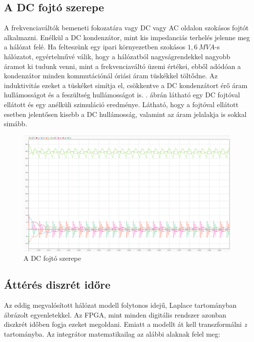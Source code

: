 \subsection{A DC fojtó szerepe}

A frekvenciaváltók bemeneti fokozatára vagy DC vagy AC oldalon szokásos fojtót alkalmazni. Enélkül a DC kondenzátor, mint kis impedanciás terhelés jelenne meg a hálózat felé. Ha felteszünk egy ipari környezetben szokásos $1,6\ MVA$-s hálózatot, egyértelművé válik, hogy a hálózatból nagyságrendekkel nagyobb áramot ki tudunk venni, mint a frekvenciaváltó üzemi értékei, ebből adódóan a kondenzátor minden kommutációnál óriási áram tüskékkel töltődne. Az induktivitás ezeket a tüskéket simítja el, csökkentve a DC kondenzátort érő áram hullámosságot és a feszültség hullámosságot is. . ábrán látható egy DC fojtóval ellátott és egy anélküli szimuláció eredménye. Látható, hogy a fojtóval ellátott esetben jelentősen kisebb a DC hullámosság, valamint az áram jelalakja is sokkal simább.

\begin{figure}[H!]
	\centering
	\includegraphics[width = \textwidth]{figures/choke_vs_nochoke_11A.png}
	\caption{A DC fojtó szerepe} 
	\label{fig:chokenochoke}
\end{figure}



\subsection{Áttérés diszrét időre}

Az eddig megvalósított hálózat modell folytonos idejű, Laplace tartományban ábrázolt egyenletekkel. Az FPGA, mint minden digitális rendszer azonban diszkrét időben fogja ezeket megoldani. Emiatt a modellt át kell transzformálni \emph{z} tartományba. Az integrátor matematikailag az alábbi alaknak felel meg:


